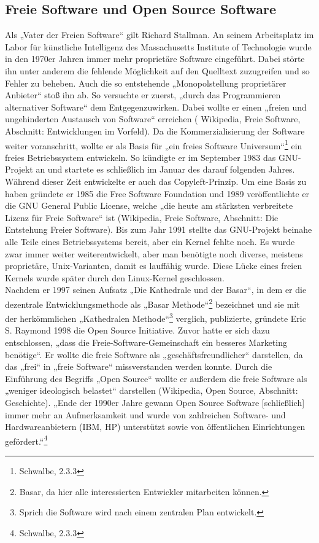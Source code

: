 \documentclass[a4paper,12pt]{article}
\begin{document}
\subsection{Freie Software und Open Source Software}
Als „Vater der Freien Software“ gilt Richard Stallman. An seinem Arbeitsplatz im Labor für künstliche Intelligenz des Massachusetts Institute of Technologie wurde in den 1970er Jahren immer mehr proprietäre Software eingeführt. Dabei störte ihn unter anderem die fehlende Möglichkeit auf den Quelltext zuzugreifen und so Fehler zu beheben. Auch die so entstehende „Monopolstellung proprietärer Anbieter“ stoß ihn ab. So versuchte er zuerst, „durch das Programmieren alternativer Software“ dem Entgegenzuwirken. Dabei wollte er einen „freien und ungehinderten Austausch von Software“ erreichen ( Wikipedia, Freie Software, Abschnitt: Entwicklungen im Vorfeld). Da die Kommerzialisierung der Software weiter voranschritt, wollte er als Basis für „ein freies Software Universum“\footnote{Schwalbe, 2.3.3} ein freies Betriebssystem entwickeln. So kündigte er im September 1983 das GNU-Projekt an und startete es schließlich im Januar des darauf folgenden Jahres. Während dieser Zeit entwickelte er auch das Copyleft-Prinzip. Um eine Basis zu haben gründete er 1985 die Free Software Foundation und 1989 veröffentlichte er die GNU General Public License, welche „die heute am stärksten verbreitete Lizenz für Freie Software“ ist (Wikipedia, Freie Software, Abschnitt: Die Entstehung Freier Software). Bis zum Jahr 1991 stellte das GNU-Projekt beinahe alle Teile eines Betriebssystems bereit, aber ein Kernel fehlte noch. Es wurde zwar immer weiter weiterentwickelt, aber man benötigte noch diverse, meistens proprietäre, Unix-Varianten, damit es lauffähig wurde. Diese Lücke eines freien Kernels wurde später durch den Linux-Kernel geschlossen.\\
Nachdem er 1997 seinen Aufsatz „Die Kathedrale und der Basar“, in dem er die dezentrale Entwicklungsmethode als „Basar Methode“\footnote{Basar, da hier alle interessierten Entwickler mitarbeiten können.} bezeichnet und sie mit der herkömmlichen „Kathedralen Methode“\footnote{Sprich die Software wird nach einem zentralen Plan entwickelt.} verglich, publizierte, gründete Eric S. Raymond 1998 die Open Source Initiative. Zuvor hatte er sich dazu entschlossen, „dass die Freie-Software-Gemeinschaft ein besseres Marketing benötige“. Er wollte die freie Software als „geschäftsfreundlicher“ darstellen, da das „frei“ in „freie Software“ missverstanden werden konnte. Durch die Einführung des Begriffs „Open Source“ wollte er außerdem die freie Software als „weniger ideologisch belastet“ darstellen (Wikipedia, Open Source, Abschnitt: Geschichte). „Ende der 1990er Jahre gewann Open Source Software [schließlich] immer mehr an Aufmerksamkeit und wurde von zahlreichen Software- und Hardwareanbietern (IBM, HP) unterstützt sowie von öffentlichen Einrichtungen gefördert.“\footnote{Schwalbe, 2.3.3}
\end{document}
